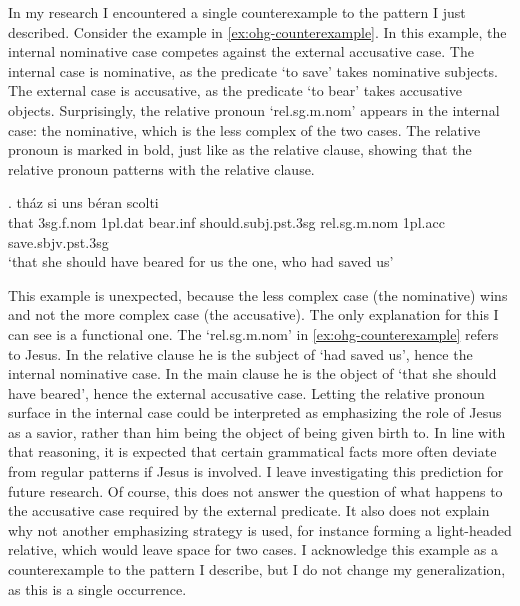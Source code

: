 In my research I encountered a single counterexample to the pattern I just described.
Consider the example in \ref{ex:ohg-counterexample}. In this example, the internal nominative case competes against the external accusative case.
The internal case is nominative, as the predicate  `to save' takes nominative subjects.
The external case is accusative, as the predicate  `to bear' takes accusative objects.
Surprisingly, the relative pronoun  `\ac{rel}.\ac{sg}.\ac{m}.\ac{nom}' appears in the internal case: the nominative, which is the less complex of the two cases. The relative pronoun is marked in bold, just like as the relative clause, showing that the relative pronoun patterns with the relative clause.

\exg. tház si uns béran scolti   \\
 that 3\ac{sg}.\ac{f}.\ac{nom} 1\ac{pl}.\ac{dat} bear.\ac{inf}\scsub{[acc]} should.\ac{subj}.\ac{pst}.3\ac{sg} \ac{rel}.\ac{sg}.\ac{m}.\ac{nom} 1\ac{pl}.\ac{acc} save.\ac{sbjv}.\ac{pst}.3\ac{sg}\scsub{[nom]}\\
 `that she should have beared for us the one, who had saved us' \label{ex:ohg-counterexample}

This example is unexpected, because the less complex case (the nominative) wins and not the more complex case (the accusative).
The only explanation for this I can see is a functional one. The  `\ac{rel}.\ac{sg}.\ac{m}.\ac{nom}' in \ref{ex:ohg-counterexample} refers to Jesus. In the relative clause he is the subject of  `had saved us', hence the internal nominative case. In the main clause he is the object of  `that she should have beared', hence the external accusative case.
Letting the relative pronoun surface in the internal case could be interpreted as emphasizing the role of Jesus as a savior, rather than him being the object of being given birth to. In line with that reasoning, it is expected that certain grammatical facts more often deviate from regular patterns if Jesus is involved. I leave investigating this prediction for future research.
Of course, this does not answer the question of what happens to the accusative case required by the external predicate. It also does not explain why not another emphasizing strategy is used, for instance forming a light-headed relative, which would leave space for two cases.
I acknowledge this example as a counterexample to the pattern I describe, but I do not change my generalization, as this is a single occurrence.

